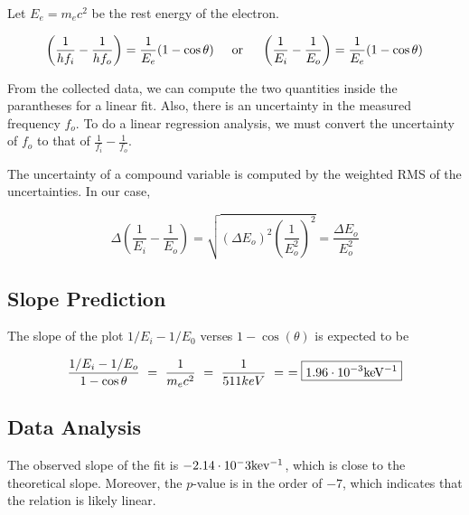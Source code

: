\documentclass{article}
\numberwithin{equation}{section}
\newcommand{\textOr}{
    {
        \hspace{5mm}
        \textrm{or}
        \hspace{5mm}
    }
}
\begin{document}
Let \( E_e = m_e c^2 \) be the rest energy of the electron.

\[
\left( \frac{1}{h f_i} - \frac{1}{h f_o} \right) = \frac{1}{E_e} (1 - \cos \theta)
\textOr
\left( \frac{1}{E_i} - \frac{1}{E_o} \right) = \frac{1}{E_e} (1 - \cos \theta)
\]

From the collected data, we can compute the two quantities 
inside the parantheses for a linear fit. Also, there is an uncertainty in the measured frequency \( f_o \). To do a linear regression analysis, we must convert the uncertainty of \( f_o \) to that of \( \frac{1}{f_i} - \frac{1}{f_o} \).

The uncertainty of a compound variable is computed by the weighted RMS of the uncertainties. In our case,

\[
\Delta \left( \frac{1}{E_i} - \frac{1}{E_o} \right) = \sqrt{\left( \Delta E_o \right)^2 \left( \frac{1}{E_o^2} \right)^2} = \frac{\Delta E_o}{E_o^2}
\]

\subsection{Slope Prediction}

The slope of the plot $1/E_i - 1/E_0$ verses $1 - \cos(\theta)$ is expected to be 

\[
\frac{1/E_i - 1/E_o}{1 - \cos \theta} \ = \ \frac 1 {m_e c^2} \ = \ \frac 1 {511keV} \ = \ = \boxed{1.96 \cdot 10^{-3} \rm keV^{-1}}
\]

\subsection{Data Analysis}
The observed slope of the fit is 
$-2.14 \cdot 10^-3 \rm kev^{-1}$, which is close to the theoretical slope. 
Moreover, the $p$-value is in the order of $-7$, which indicates that 
the relation is likely linear. 
\end{document}
